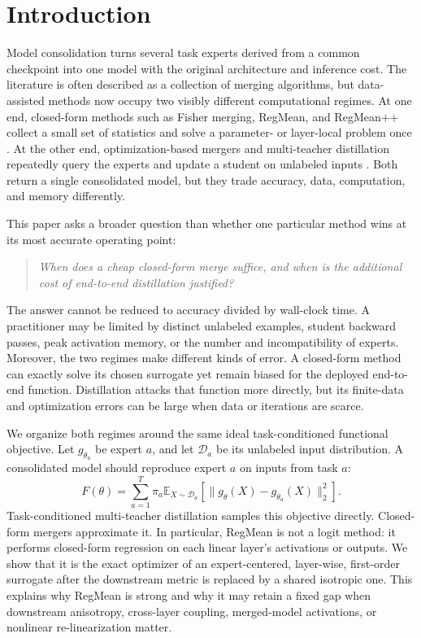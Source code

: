 \documentclass[letterpaper]{article} %
\theoremstyle{plain}
\theoremstyle{definition}
\begin{document}
\section{Introduction}
\label{sec:intro}

Model consolidation turns several task experts derived from a common checkpoint into one model with the original architecture and inference cost.
The literature is often described as a collection of merging algorithms, but data-assisted methods now occupy two visibly different computational regimes.
At one end, closed-form methods such as Fisher merging, RegMean, and RegMean++ collect a small set of statistics and solve a parameter- or layer-local problem once \citep{matena2022fisher,jin2023regmean,regmeanplusplus2025}.
At the other end, optimization-based mergers and multi-teacher distillation repeatedly query the experts and update a student on unlabeled inputs \citep{yang2024adamerging,prodistill2025,samerging2025}.
Both return a single consolidated model, but they trade accuracy, data, computation, and memory differently.

This paper asks a broader question than whether one particular method wins at its most accurate operating point:
\begin{quote}
\emph{When does a cheap closed-form merge suffice, and when is the additional cost of end-to-end distillation justified?}
\end{quote}
The answer cannot be reduced to accuracy divided by wall-clock time.
A practitioner may be limited by distinct unlabeled examples, student backward passes, peak activation memory, or the number and incompatibility of experts.
Moreover, the two regimes make different kinds of error.
A closed-form method can exactly solve its chosen surrogate yet remain biased for the deployed end-to-end function.
Distillation attacks that function more directly, but its finite-data and optimization errors can be large when data or iterations are scarce.

We organize both regimes around the same ideal task-conditioned functional objective.
Let $g_{\theta_a}$ be expert $a$, and let $\mathcal D_a$ be its unlabeled input distribution.
A consolidated model should reproduce expert $a$ on inputs from task $a$:
\begin{equation}
F(\theta)=\sum_{a=1}^{T}\pi_a
\mathbb E_{X\sim\mathcal D_a}
\left[\|g_\theta(X)-g_{\theta_a}(X)\|_2^2\right].
\label{eq:functional-objective}
\end{equation}
Task-conditioned multi-teacher distillation samples this objective directly.
Closed-form mergers approximate it.
In particular, RegMean is not a logit method: it performs closed-form regression on each linear layer's activations or outputs.
We show that it is the exact optimizer of an expert-centered, layer-wise, first-order surrogate after the downstream metric is replaced by a shared isotropic one.
This explains why RegMean is strong and why it may retain a fixed gap when downstream anisotropy, cross-layer coupling, merged-model activations, or nonlinear re-linearization matter.
\end{document}
